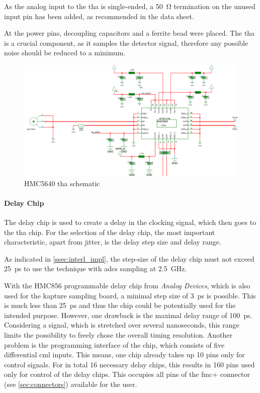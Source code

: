 As the analog input to the \gls{tha} is single-ended, a \SI{50}{\ohm} termination on the unused input pin has been added, as recommended in the data sheet.\cite{hmc5640}

At the power pins, decoupling capacitors and a ferrite bead  were placed. The \gls{tha} is a crucial component, as it samples the detector signal, therefore any possible noise should be reduced to a minimum.

\begin{figure}[tbh]
	\centering
	\includegraphics[width = \textwidth]{chap/04-work/img/hmc5640}
	\caption[HMC5640 THA schematic]{HMC5640 \gls{tha} schematic}
	\label{fig:hmc5640}
\end{figure}


\paragraph{Delay Chip}
The delay chip is used to create a delay in the clocking signal, which then goes to the \gls{tha} chip. For the selection of the delay chip, the most important characteristic, apart from jitter, is the delay step size and delay range. 

As indicated in \autoref{ssec:interl_impl}, the step-size of the delay chip must not exceed \SI{25}{\pico \second} to use the technique with \glspl{adc} sampling at \SI{2.5}{\giga \hertz}.

With the HMC856 programmable delay chip from \textit{Analog Devices}, which is also used for the \gls{kapture} sampling board, a minimal step size of \SI{3}{\pico\second} \cite{hmc856} is possible.
This is much less than  \SI{25}{\pico \second} and thus the chip could be potentially used for the intended purpose.
However, one drawback is the maximal delay range of \SI{100}{\pico\second}.
Considering a signal, which is stretched over several nanoseconds, this range limits the possibility to freely chose the overall timing resolution.
Another problem is the programming interface of the chip, which consists of five differential \gls{cml} inputs.
This means, one chip already takes up 10 pins only for control signals.
For in total 16 necessary delay chips, this results in 160 pins used only for control of the delay chips.
This occupies all pins of the \gls{fmc}+ connector (see \autoref{sec:connectors}) available for the user. 

